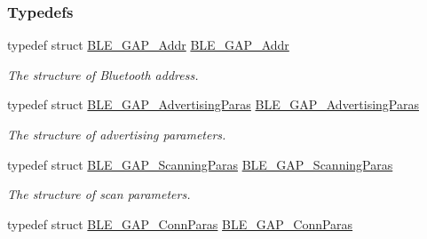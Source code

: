 \subsubsection*{Typedefs}
\begin{DoxyCompactItemize}
\item 
typedef struct \hyperlink{struct_b_l_e___g_a_p___addr}{B\+L\+E\+\_\+\+G\+A\+P\+\_\+\+Addr} \hyperlink{group___b_l_e___g_a_p_gab3c91ad961e6fdd50bef33de87de0bc4}{B\+L\+E\+\_\+\+G\+A\+P\+\_\+\+Addr}\hypertarget{group___b_l_e___g_a_p_gab3c91ad961e6fdd50bef33de87de0bc4}{}\label{group___b_l_e___g_a_p_gab3c91ad961e6fdd50bef33de87de0bc4}

\begin{DoxyCompactList}\small\item\em The structure of Bluetooth address. \end{DoxyCompactList}\item 
typedef struct \hyperlink{struct_b_l_e___g_a_p___advertising_paras}{B\+L\+E\+\_\+\+G\+A\+P\+\_\+\+Advertising\+Paras} \hyperlink{group___b_l_e___g_a_p_ga559e74f78323c417f436650ee01c23ae}{B\+L\+E\+\_\+\+G\+A\+P\+\_\+\+Advertising\+Paras}\hypertarget{group___b_l_e___g_a_p_ga559e74f78323c417f436650ee01c23ae}{}\label{group___b_l_e___g_a_p_ga559e74f78323c417f436650ee01c23ae}

\begin{DoxyCompactList}\small\item\em The structure of advertising parameters. \end{DoxyCompactList}\item 
typedef struct \hyperlink{struct_b_l_e___g_a_p___scanning_paras}{B\+L\+E\+\_\+\+G\+A\+P\+\_\+\+Scanning\+Paras} \hyperlink{group___b_l_e___g_a_p_gadacc974c7889bcd4ee096ce1968f8a6d}{B\+L\+E\+\_\+\+G\+A\+P\+\_\+\+Scanning\+Paras}\hypertarget{group___b_l_e___g_a_p_gadacc974c7889bcd4ee096ce1968f8a6d}{}\label{group___b_l_e___g_a_p_gadacc974c7889bcd4ee096ce1968f8a6d}

\begin{DoxyCompactList}\small\item\em The structure of scan parameters. \end{DoxyCompactList}\item 
typedef struct \hyperlink{struct_b_l_e___g_a_p___conn_paras}{B\+L\+E\+\_\+\+G\+A\+P\+\_\+\+Conn\+Paras} \hyperlink{group___b_l_e___g_a_p_ga6918288547430eb79aa598cfce123b9d}{B\+L\+E\+\_\+\+G\+A\+P\+\_\+\+Conn\+Paras}\hypertarget{group___b_l_e___g_a_p_ga6918288547430eb79aa598cfce123b9d}{}\label{group___b_l_e___g_a_p_ga6918288547430eb79aa598cfce123b9d}


\end{DoxyCompactItemize}
